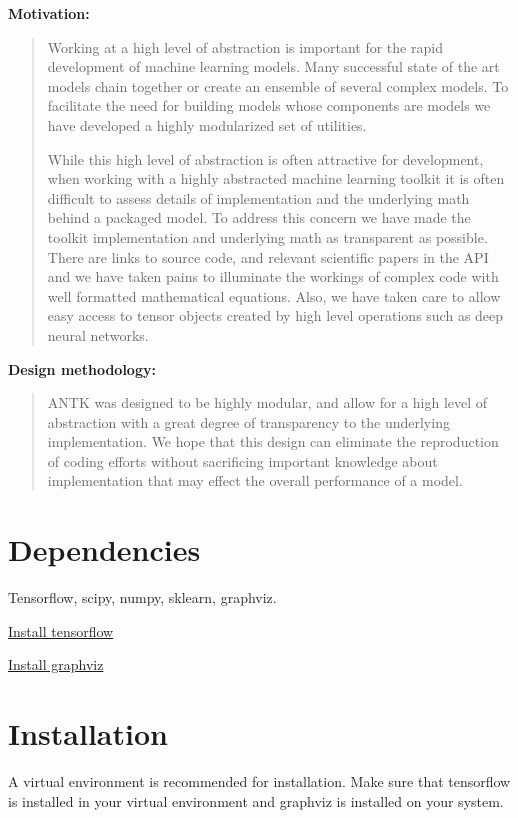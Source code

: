\documentclass[letterpaper,10pt,english]{sphinxmanual}
\begin{document}
\textbf{Motivation:}
\begin{quote}

Working at a high level of abstraction is important for the rapid
development of machine learning models. Many successful state of the art models chain together or create an ensemble of several
complex models. To facilitate the need for building models whose components are models we have
developed a highly modularized set of utilities.

While this high level of abstraction is often attractive for development, when working with a highly abstracted machine learning toolkit it
is often difficult to assess details of implementation and the underlying math behind a packaged model. To address this concern
we have made the toolkit implementation and underlying math as transparent as possible. There are links to source code, and relevant scientific papers
in the API and we have taken pains to illuminate the workings of complex code with well formatted mathematical equations. Also,
we have taken care to allow easy access to tensor objects created by high level operations such as deep neural networks.
\end{quote}

\textbf{Design methodology:}
\begin{quote}

ANTK was designed to be highly modular, and allow for a high level of abstraction with a great degree of transparency to
the underlying implementation. We hope that this design can eliminate the reproduction of coding efforts without sacrificing important
knowledge about implementation that may effect the overall performance of a model.
\end{quote}


\chapter{Dependencies}
\label{index:about-antk}\label{index:dependencies}
Tensorflow, scipy, numpy, sklearn, graphviz.

\href{https://www.tensorflow.org/versions/r0.7/get\_started/os\_setup.html}{Install tensorflow}

\href{http://www.graphviz.org/}{Install graphviz}


\chapter{Installation}
\label{index:installation}
A virtual environment is recommended for installation. Make sure that tensorflow is installed in your virtual environment
and graphviz is installed on your system.
\end{document}
